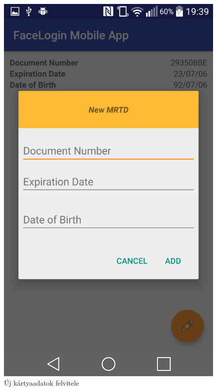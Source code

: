 \begin{figure}[h]
 \begin{minipage}{.50\textwidth} 
\centering
    \includegraphics[scale=0.07]{img/new_mrtd}
    \caption{Új kártyaadatok felvitele}
 \end{minipage}
 \begin{minipage}{.50\textwidth} 
\centering

\end{minipage}
\end{figure}
